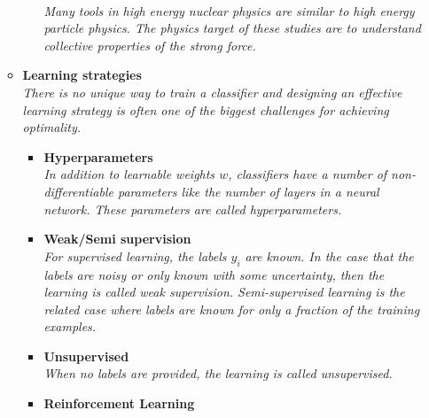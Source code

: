 \documentclass[12pt,letterpaper]{article}
\begin{document}
\begin{itemize}
\begin{itemize}
\begin{itemize}
			\\\textit{Many tools in high energy nuclear physics are similar to high energy particle physics.  The physics target of these studies are to understand collective properties of the strong force.}
		\end{itemize}
		\item \textbf{Learning strategies}
		\\\textit{There is no unique way to train a classifier and designing an effective learning strategy is often one of the biggest challenges for achieving optimality.}
			\begin{itemize}
				\item \textbf{Hyperparameters}~\cite{Bardhan:2024ibw,Allaire:2023dfg,Schroff:2023see,DeZoort:2023dvb,Bevan:2017stx,Dudko:2021cie,Tani:2020dyi}
				\\\textit{In addition to learnable weights $w$, classifiers have a number of non-differentiable parameters like the number of layers in a neural network.  These parameters are called hyperparameters.}
				\item \textbf{Weak/Semi supervision}~\cite{Rieck:2025xnh,Chen:2024nvc,Lieberman:2024hga,Beauchesne:2023vie,Witkowski:2023htt,Bardhan:2023mia,Dolan:2022ikg,LeBlanc:2022bwd,Finke:2022lsu,Li:2022omf,Komiske:2022vxg,Lieberman:2021krq,Lee:2019ssx,Dahbi:2020zjw,Brewer:2020och,Amram:2020ykb,collaboration2020dijet,Metodiev:2018ftz,Komiske:2018vkc,Cohen:2017exh,Borisyak:2019vbz,Collins:2019jip,Collins:2018epr,Komiske:2018oaa,Metodiev:2017vrx,Dery:2017fap}
				\\\textit{For supervised learning, the labels $y_i$ are known.  In the case that the labels are noisy or only known with some uncertainty, then the learning is called weak supervision.  Semi-supervised learning is the related case where labels are known for only a fraction of the training examples.}
				\item \textbf{Unsupervised}~\cite{Abdelhaq:2025nch,Chowdhury:2025mul,Coradin:2025ees,Katel:2024ygn,Sheldon:2024sbe,Cai:2024xnt,Lu:2024ict,Kishimoto:2023cys,Badea:2023jdb,Kitouni:2023rct,Huang:2023kgs,Dillon:2021gag,Howard:2021pos,Cai:2020vzx,Dillon:2019cqt,1797846,Komiske:2019fks,Mackey:2015hwa}
                                  \\\textit{When no labels are provided, the learning is called unsupervised.}
				\item \textbf{Reinforcement Learning}~\cite{Dillon:2025dxr,Baretz:2025zsv,Zeng:2025xbh,Nishimura:2024apb,Angloher:2023oya,Alvestad:2023jgl,Nishimura:2023wdu,Dersy:2022bym,Windisch:2021mem,Cranmer:2021gdt,Harvey:2021oue,John:2020sak,Brehmer:2020brs,Carrazza:2019efs}

\end{itemize}
\end{itemize}
\end{itemize}
\end{document}
